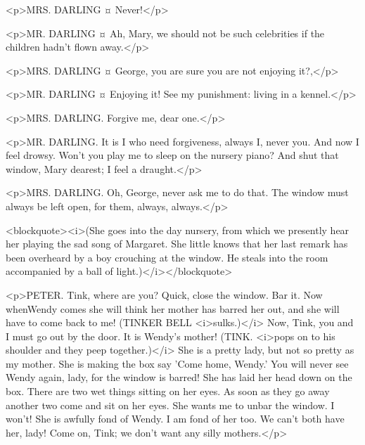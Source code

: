 <p>MRS. DARLING ¤
Never!</p>

<p>MR. DARLING ¤
Ah, Mary, we should not be such celebrities if the children hadn't flown away.</p>

<p>MRS. DARLING ¤
George, you are sure you are not enjoying it?,</p>

<p>MR. DARLING ¤
Enjoying it! See my punishment: living in a kennel.</p>

<p>MRS. DARLING. Forgive me, dear one.</p>

<p>MR. DARLING. It is I who need forgiveness, always I, never you. And now I feel drowsy.
Won't you play me to sleep on the nursery piano? And shut that window, Mary dearest; I feel a draught.</p>

<p>MRS. DARLING. Oh, George, never ask me to do that. The window must always be left open, for them, always, always.</p>

<blockquote><i>(She goes into the day nursery, from which we presently hear her playing the sad song of Margaret. She little knows that her last remark has been overheard by a boy crouching at the window. He steals into the room accompanied by a ball of light.)</i></blockquote>

<p>PETER. Tink, where are you? Quick, close the window.
Bar it.
Now whenWendy comes she will think her mother has barred her out, and she will have to come back to me! (TINKER BELL <i>sulks.)</i> Now, Tink, you and I must go out by the door.
It is Wendy's mother! (TINK. <i>pops on to his shoulder and they peep together.)</i> She is a pretty lady, but not so pretty as my mother.
She is making the box say 'Come home, Wendy.' You will never see Wendy again, lady, for the window is barred!
She has laid her head down on the box. There are two wet things sitting on her eyes. As soon as they go away another two come and sit on her eyes.
She wants me to unbar the window. I won't! She is awfully fond of Wendy. I am fond of her too. We can't both have her, lady!
Come on, Tink; we don't want any silly mothers.</p>

